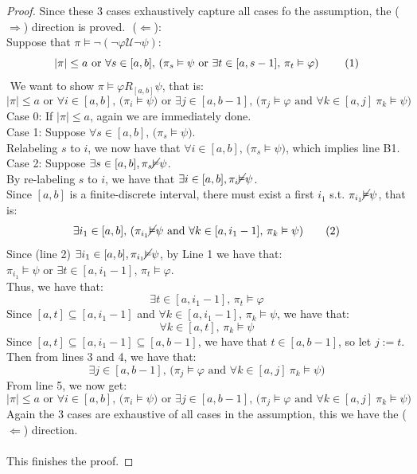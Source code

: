 \documentclass[runningheads]{llncs}
\renewcommand{\phi}{\varphi}
\begin{document}
\begin{proof}
\indent Since these $3$ cases exhaustively capture all cases fo the assumption, the ($\Rightarrow$) direction is proved.
$ $ \newline
\noindent ($\Leftarrow$):\\
\indent Suppose that $\pi \vDash \neg (\neg \phi \mathcal{U} \neg \psi)$:
\[
|\pi| \le a \text{ or } \forall s \in [a,b] \text{, (} \pi_s \vDash \psi \text{ or } \exists t \in [a, s-1] \text{, } \pi_t \vDash \phi \text{) \tag{1}}
\]
$ $ \newline
\indent We want to show $\pi \vDash \phi R_{[a,b]} \psi$, that is:
\[ |\pi| \leq a \text{ or } \forall i \in [a,b] \text{, (} \pi_i \vDash \psi \text{) or } \exists j \in [a,b-1] \text{, (} \pi_j \vDash \phi \text{ and } \forall k \in [a, j] \ \pi_k \vDash \psi \text{)} \tag{B1} \]
\indent Case 0: If $|\pi| \leq a$, again we are immediately done. \\
\indent Case 1: Suppose $\forall s \in [a,b] \text{, (} \pi_s \vDash \psi \text{)}$.\\ 
\indent \indent Relabeling $s$ to $i$, we now have that $\forall i \in [a, b] \text{, (}\pi_s \vDash \psi \text{)}$, which implies line B1. \\
\indent Case 2: Suppose $\exists s \in [a,b], \pi_s \cancel{\vDash} \psi$.\\
\indent \indent By re-labeling $s$ to $i$, we have that $\exists i \in [a,b], \pi_i \cancel{\vDash} \psi$.\\
\indent \indent Since $[a,b]$ is a finite-discrete interval, there must exist a first $i_1$ s.t. $\pi_{i_1} \cancel{\vDash} \psi$, that is:
\[ 
\exists i_1 \in [a,b]\text{, (}  \pi_{i_1} \cancel{\vDash} \psi  \text{ and }  \forall k \in [a, i_1 - 1] \text{, } \pi_{k} \vDash \psi \text{)}
\tag{2}\]
\indent \indent Since (line 2) $\exists i_1 \in [a,b], \pi_{i_1} \cancel{\vDash} \psi$, by Line 1 we have that: $\pi_{i_1} \vDash \psi \text{ or } \exists t \in [a, i_1 - 1] \text{, } \pi_t \vDash \phi$.\\
\indent \indent Thus, we have that: 
\[
\exists t \in [a, i_1 - 1] \text{, } \pi_t \vDash \phi \tag{3}
\]
\indent \indent Since  $[a, t] \subseteq [a, i_1 - 1]$ and $\forall k \in [a, i_1 - 1] \text{, } \pi_{k} \vDash \psi$, we have that:
\[ 
\forall k \in [a, t]\text{, } \pi_{k} \vDash \psi \tag{4}
\]
\indent \indent Since $[a,t] \subseteq [a, i_1 - 1] \subseteq [a,b-1]$, we have that $t \in [a,b-1]$, so let $j := t$.
\indent \indent Then from lines 3 and 4, we have that:
\[
\exists j \in [a,b-1] \text{, (} \pi_j \vDash \phi \text{ and } \forall k \in [a, j] \ \pi_k \vDash \psi \text{)} \tag{5}
\]
\indent \indent From line 5, we now get:
\[ 
|\pi| \leq a \text{ or } \forall i \in [a,b] \text{, (} \pi_i \vDash \psi \text{) or } \exists j \in [a,b-1] \text{, (} \pi_j \vDash \phi \text{ and } \forall k \in [a, j] \ \pi_k \vDash \psi \text{)} \tag{B1}
\]
\indent Again the 3 cases are exhaustive of all cases in the assumption, this we have the ($\Leftarrow$) direction.\\
\\
This finishes the proof.
\end{proof}
\end{document}
